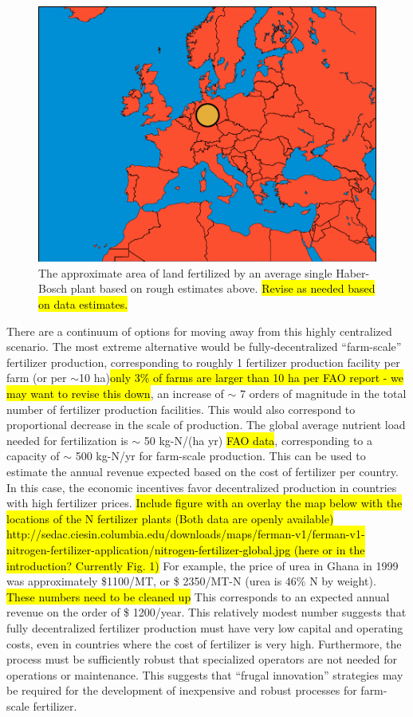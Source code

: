 \begin{figure}
    \centering
    \includegraphics{Figures/approx_size.pdf}
    \caption{The approximate area of land fertilized by an average single Haber-Bosch plant based on rough estimates above. \hl{Revise as needed based on data estimates.}}
    \label{fig:map}
\end{figure}
There are a continuum of options for moving away from this highly centralized scenario. The most extreme alternative would be fully-decentralized ``farm-scale'' fertilizer production, corresponding to roughly 1 fertilizer production facility per farm (or per $\sim$10 ha)\hl{only 3\% of farms are larger than 10 ha per FAO report - we may want to revise this down}, an increase of $\sim$ 7 orders of magnitude in the total number of fertilizer production facilities. This would also correspond to proportional decrease in the scale of production. The global average nutrient load needed for fertilization is $\sim$ 50 kg-N/(ha yr) \needcite \hl{FAO data}, 
corresponding to a capacity of $\sim$ 500 kg-N/yr for farm-scale production. This can be used to estimate the annual revenue expected based on the cost of fertilizer per country. 
In this case, the economic incentives favor decentralized production in countries with high fertilizer prices. 
\hl{Include figure with an overlay the map below with the locations of the N fertilizer plants (Both data are openly available) http://sedac.ciesin.columbia.edu/downloads/maps/ferman-v1/ferman-v1-nitrogen-fertilizer-application/nitrogen-fertilizer-global.jpg (here or in the introduction? Currently Fig. 1)}
For example, the price of urea in Ghana in 1999 was approximately \$1100/MT, or \$ 2350/MT-N (urea is 46\% N by weight). \hl{These numbers need to be cleaned up}
This corresponds to an expected annual revenue on the order of \$ 1200/year. This relatively modest number suggests that fully decentralized fertilizer production must have very low capital and operating costs, even in countries where the cost of fertilizer is very high. Furthermore, the process must be sufficiently robust that specialized operators are not needed for operations or maintenance. This suggests that ``frugal innovation'' strategies \cite{Weyrauch_2016} may be required for the development of inexpensive and robust processes for farm-scale fertilizer.

